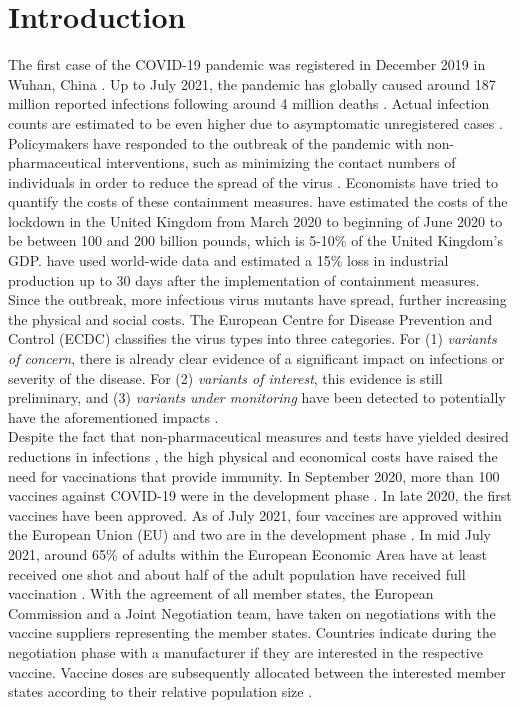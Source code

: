 \section{Introduction}
The first case of the COVID-19 pandemic was registered in December 2019 in Wuhan, China \citep{Hui.2020}. Up to July 2021, the pandemic has globally caused around 187 million reported infections following around 4 million deaths \citep{ecdc.2021a}. Actual infection counts are estimated to be even higher due to asymptomatic unregistered cases \citep{Byambasuren.2020}. Policymakers have responded to the outbreak of the pandemic with non-pharmaceutical interventions, such as minimizing the contact numbers of individuals in order to reduce the spread of the virus \citep{Gabler.2021}.  Economists have tried to quantify the costs of these containment measures. \cite{Miles.2020} have estimated the costs of the lockdown in the United Kingdom from March 2020 to beginning of June 2020 to be between 100 and 200 billion pounds, which is 5-10\% of the United Kingdom's GDP. \cite{Deb.2020} have used world-wide data and estimated a 15\% loss in industrial production up to 30 days after the implementation of containment measures. \\

Since the outbreak, more infectious virus mutants have spread, further increasing the physical and social costs. The European Centre for Disease Prevention and Control (ECDC) classifies the virus types into three categories. For (1) \textit{variants of concern}, there is already clear evidence of a significant impact on infections or severity of the disease. For (2) \textit{variants of interest}, this evidence is still preliminary, and (3) \textit{variants under monitoring} have been detected to potentially have the aforementioned impacts \citep{ecdc.2021b}. \\ 


Despite the fact that non-pharmaceutical measures and tests have yielded desired reductions in infections \citep{Gabler.2021}, the high physical and economical costs have raised the need for vaccinations that provide immunity.
In September 2020, more than 100 vaccines against COVID-19 were in the development phase \citep{Mullard.2020}. In late 2020, the first vaccines have been approved. As of July 2021, four vaccines are approved within the European Union (EU) and two are in the development phase \citep{ECa.2021}. In mid July 2021, around 65\% of adults within the European Economic Area have at least received one shot and about half of the adult population have received full vaccination \citep{ecdc.2021a}. With the agreement of all member states, the European Commission and a Joint Negotiation team, have taken on negotiations with the vaccine suppliers representing the member states. Countries indicate during the negotiation phase with a manufacturer if they are interested in the respective vaccine. Vaccine doses are subsequently allocated between the interested member states according to their relative population size \citep{ec.2021}. \\

